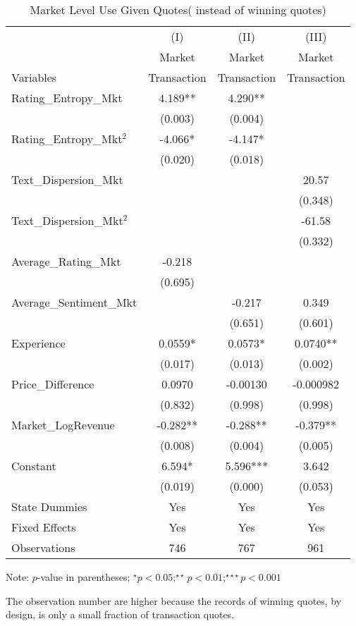 \begin{table}[]
\centering
\begin{threeparttable}[t]
\begin{tabular}{@{}lccc@{}}
\toprule
 & (I) & (II) & (III) \\ 
 & Market   & Market    & Market    \\ 
 Variables &Transaction & Transaction & Transaction \\ \midrule
Rating\_Entropy\_Mkt  & 4.189** & 4.290** &  \\
 & (0.003) & (0.004) &  \\
Rating\_Entropy\_Mkt$^2$ & -4.066* & -4.147* &  \\
 & (0.020) & (0.018) &  \\
Text\_Dispersion\_Mkt &  &  & 20.57 \\
 &  &  & (0.348) \\
Text\_Dispersion\_Mkt$^2$ &  &  & -61.58 \\
 &  &  & (0.332) \\
Average\_Rating\_Mkt & -0.218 &  &  \\
 & (0.695) &  &  \\
Average\_Sentiment\_Mkt &  & -0.217 & 0.349 \\
 &  & (0.651) & (0.601) \\
Experience & 0.0559* & 0.0573* & 0.0740** \\
 & (0.017) & (0.013) & (0.002) \\
Price\_Difference & 0.0970 & -0.00130 & -0.000982 \\
 & (0.832) & (0.998) & (0.998) \\
 Market\_LogRevenue & -0.282** & -0.288** & -0.379** \\
 & (0.008) & (0.004) & (0.005) \\
Constant & 6.594* & 5.596*** & 3.642 \\
 & (0.019) & (0.000) & (0.053) \\
State Dummies  & Yes        & Yes        & Yes        \\
Fixed Effects  & Yes        & Yes        & Yes        \\
Observations & 746 & 767 & 961 \\ \bottomrule
\end{tabular}
\begin{tablenotes}
\item Note: $p$-value in parentheses; $^\star p<0.05;^{\star\star} p<0.01;^{\star\star\star} p<0.001 $
\item The observation number are higher because the records of winning quotes, by design, is only a small fraction of transaction quotes.  
\end{tablenotes}
\caption{Market Level Use Given Quotes( instead of winning quotes) }
\end{threeparttable}
\label{reg_mkt_alt_measure}
\end{table}
